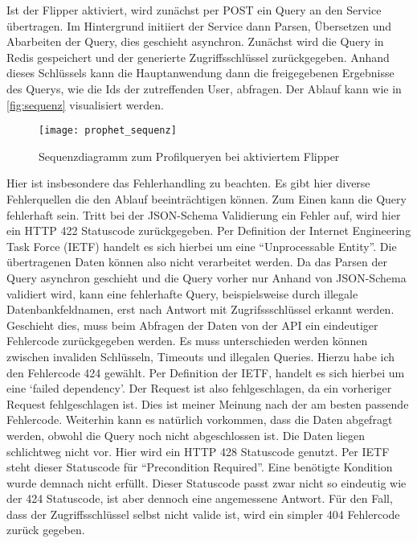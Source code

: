 Ist der Flipper aktiviert, wird zunächst per POST ein Query an den Service übertragen. Im Hintergrund initiiert der Service dann Parsen, Übersetzen und Abarbeiten der Query, dies geschieht asynchron. Zunächst wird die Query in Redis gespeichert und der generierte Zugriffsschlüssel zurückgegeben.
Anhand dieses Schlüssels kann die Hauptanwendung dann die freigegebenen Ergebnisse des Querys, wie die Ids der zutreffenden User, abfragen. Der Ablauf kann wie in \autoref{fig:sequenz} visualisiert werden.

\begin{figure}[!ht]
    \centering
    \caption{Sequenzdiagramm zum Profilqueryen bei aktiviertem Flipper}
    \label{fig:sequenz}
    \texttt{[image: prophet\_sequenz]}
\end{figure}

Hier ist insbesondere das Fehlerhandling zu beachten. Es gibt hier diverse Fehlerquellen die den Ablauf beeinträchtigen können. Zum Einen kann die Query fehlerhaft sein. 
Tritt bei der JSON-Schema Validierung ein Fehler auf, wird hier ein HTTP 422 Statuscode zurückgegeben. Per Definition der Internet Engineering Task Force (IETF)\cite{ietf:424} handelt es sich hierbei um eine ``Unprocessable Entity''. Die übertragenen Daten können also nicht verarbeitet werden.
Da das Parsen der Query asynchron geschieht und die Query vorher nur Anhand von JSON-Schema validiert wird, kann eine fehlerhafte Query, beispielsweise durch illegale Datenbankfeldnamen, erst nach Antwort mit Zugrifssschlüssel erkannt werden. Geschieht dies, muss beim Abfragen der Daten von der API ein eindeutiger Fehlercode zurückgegeben werden. Es muss unterschieden werden können zwischen invaliden Schlüsseln, Timeouts und illegalen Queries. Hierzu habe ich den Fehlercode 424 gewählt. Per Definition der IETF\cite{ietf:424}, handelt es sich hierbei um eine `failed dependency'. Der Request ist also fehlgeschlagen, da ein vorheriger Request fehlgeschlagen ist. Dies ist meiner Meinung nach der am besten passende Fehlercode.
Weiterhin kann es natürlich vorkommen, dass die Daten abgefragt werden, obwohl die Query noch nicht abgeschlossen ist. Die Daten liegen schlichtweg nicht vor. Hier wird ein HTTP 428 Statuscode genutzt. Per IETF\cite{ietf:428} steht dieser Statuscode für ``Precondition Required''. Eine benötigte Kondition wurde demnach nicht erfüllt. Dieser Statuscode passt zwar nicht so eindeutig wie der 424 Statuscode, ist aber dennoch eine angemessene Antwort.
Für den Fall, dass der Zugriffsschlüssel selbst nicht valide ist, wird ein simpler 404 Fehlercode zurück gegeben.
